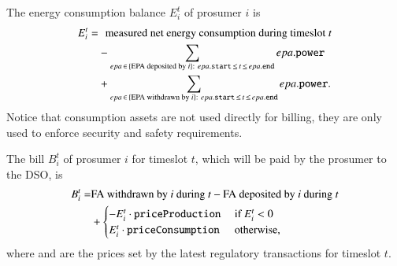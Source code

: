 The energy consumption balance $E_i^t$ of prosumer $i$ is
\begin{align*}
E_i^t = & \hphantom{+} \text{measured net energy consumption during timeslot } t \\ %
 & - \sum_{epa \,\in\, \{\text{EPA deposited by } i\}: ~ epa.\field{start} \,\leq\, t \,\leq\, epa.\field{end}} epa.\field{power} \\
 & + \sum_{epa \,\in\, \{\text{EPA withdrawn by } i\}: ~ epa.\field{start} \,\leq\, t \,\leq\, epa.\field{end}} epa.\field{power} .
\end{align*}
Notice that consumption assets are not used directly for billing, they are only used to enforce security and safety requirements.

The bill $B_i^t$ of prosumer $i$ for timeslot $t$, which will be paid
by the prosumer to the DSO, is
\begin{align*}
B_i^t = &  \text{FA withdrawn by $i$ during $t$} - \text{FA deposited by $i$ during $t$} \\
 & + \begin{cases}
- E_i^t \cdot \texttt{priceProduction} & \text{ if } E_i^t < 0 \\
 E_i^t \cdot \texttt{priceConsumption} & \text{ otherwise,} 
\end{cases}
\end{align*}
where {} and {} are the
prices set by the latest regulatory transactions for timeslot $t$. 

